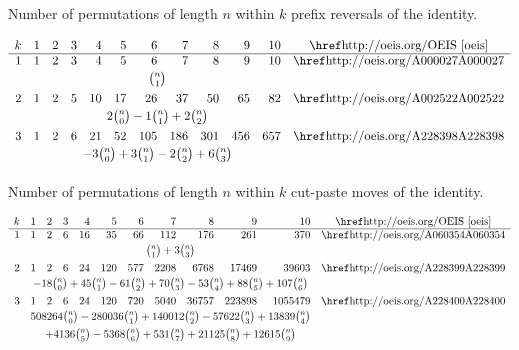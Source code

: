     \begin{table}[t]
    \caption{Number of permutations of length $n$ within $k$ prefix reversals of the
    identity.}
    \begin{footnotesize}
    $$
    \begin{array}{rrrrrrrrrrrc}
    k &1&2&3&4&5&6&7&8&9&10&\text{\OEISref}\\\hline
    1&1&2&3&4&5&6&7&8&9&10&\text{\OEISlink{A000027}}\\[0.5ex]
    &\multicolumn{10}{c}{{n\choose 1}}&\\[1ex]
    2&1&2&5&10&17&26&37&50&65&82&\text{\OEISlink{A002522}}\\[0.5ex]
    &\multicolumn{10}{c}{2 \nc0 -1 \nc1 + 2\nc2  }&\\[1ex]
    3&1&2&6&21&52&105&186&301&456&657&\text{\OEISlink{A228398}}\\[0.5ex]
    &\multicolumn{10}{c}{ -3 \nc0 + 3 \nc1 - 2\nc2 + 6\nc3}&\\[1ex]
    \end{array}
    $$
    \end{footnotesize}
    \end{table}


    \begin{table}[t]
    \caption{Number of permutations of length $n$ within $k$ cut-paste moves of the
    identity.}
    \begin{footnotesize}
    $$
    \begin{array}{rrrrrrrrrrrc}
    k &1&2&3&4&5&6&7&8&9&10&\text{\OEISref}\\\hline
    1&1&2&6&16&35&66&112&176&261&370&\text{\OEISlink{A060354}}\\[0.5ex]
    &\multicolumn{10}{c}{\nc1 + 3\nc3 }&\\[1ex]
    2&1&2&6&24&120&577&2208&6768&17469&39603&\text{\OEISlink{A228399}}\\[0.5ex]
    &\multicolumn{10}{c}{-18\nc0 + 45\nc1 - 61\nc2 + 70\nc3 - 53\nc4 + 88\nc5
    + 107\nc6}&\\[1ex]
    3&1&2&6&24&120&720&5040&36757&223898&1055479&\text{\OEISlink{A228400}}\\[0.5ex]
    &\multicolumn{10}{c}{508264\nc0 - 280036\nc1 + 140012\nc2 - 57622\nc3 +
    13839\nc4}&\\[1ex]
    &\multicolumn{10}{c}{+ 4136\nc5-5368\nc6 + 531\nc7 + 21125\nc8 +
    12615\nc9} \\ 
    \end{array}
    $$
    \end{footnotesize}
    \end{table}
  

